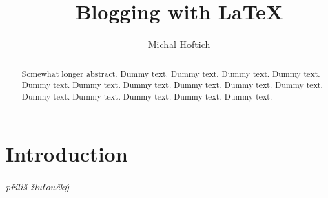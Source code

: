 \documentclass[../index2018.tex]{subfiles}
\title{Blogging with \LaTeX}
\author{Michal Hoftich}
\begin{document}
\maketitle

\tableofcontents

\begin{abstract}
  Somewhat longer abstract. Dummy text. Dummy text. Dummy text. Dummy text.
  Dummy text. Dummy text. Dummy text. Dummy text. Dummy text. Dummy text. Dummy
  text. Dummy text. Dummy text. Dummy text. Dummy text.
\end{abstract}


\section{Introduction}

\textit{příliš žluťoučký}

\printbibliography
\end{document}
